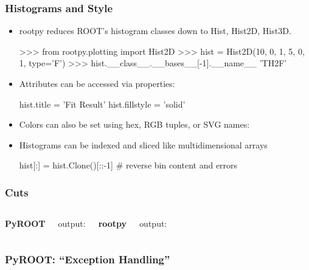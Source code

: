 \documentclass[10pt,professionalfonts,serif,usenames,dvipsnames,svgnames,table]{beamer}
\begin{document}
\begin{frame}[fragile]
    \frametitle{Histograms and Style}
    \begin{itemize}
        \item rootpy reduces ROOT's histogram classes down to Hist, Hist2D,
            Hist3D.
\begin{pyglist}[language=python,style=vs]
>>> from rootpy.plotting import Hist2D
>>> hist = Hist2D(10, 0, 1, 5, 0, 1, type='F')
>>> hist.__class__.__bases__[-1].__name__
'TH2F'
\end{pyglist}
\item Attributes can be accessed via properties:
\begin{pyglist}[language=python,texcl=true,style=vs]
hist.title = 'Fit Result'
hist.fillstyle = 'solid'
\end{pyglist}
\item Colors can also be set using hex, RGB tuples, or SVG names:
\item Histograms can be indexed and sliced like multidimensional arrays
\begin{pyglist}[language=python,texcl=true,style=vs]
hist[:] = hist.Clone()[::-1]  # reverse bin content and errors
\end{pyglist}
\end{itemize}
\end{frame}

\begin{frame}[fragile]
    \frametitle{Cuts}
    \begin{columns}
        {\bf PyROOT}
        
        \vspace{-.3cm}
        output:
        \vspace{-.3cm}
        
        {\bf rootpy}
        
        \vspace{-.3cm}
        output:
        \vspace{-.3cm}
        
    \end{columns}
\end{frame}

\begin{frame}[fragile]
    \frametitle{PyROOT: ``Exception Handling''}

    
    \vspace{-.5cm}
    
\end{frame}
\end{document}
